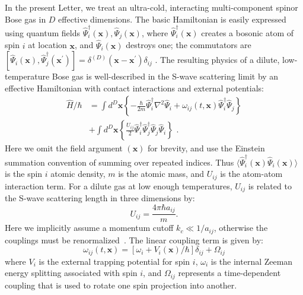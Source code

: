 \documentclass[aps,prl,twocolumn,showpacs,amsmath,amssymb,superscriptaddress]{revtex4-1}
\newcommand{\xvec}{\boldsymbol{x}}
\begin{document}
In the present Letter, we treat an ultra-cold,
interacting multi-component spinor Bose gas in $D$ effective dimensions.
The basic Hamiltonian is easily expressed using quantum fields
$\widehat{\Psi}_{i}^{\dagger}(\xvec),\widehat{\Psi}_{j}(\xvec)$,
where $\widehat{\Psi}_{i}^{\dagger}(\xvec)$ creates a bosonic atom of spin $i$
at location $\xvec$, and $\widehat{\Psi}_{i}(\xvec)$ destroys one;
the commutators are
$[\widehat{\Psi}_{i}(\xvec),\widehat{\Psi}_{j}^{\dagger}(\xvec^\prime)] =
\delta^{(D)}(\xvec-\xvec^\prime)\delta_{ij}\,\,.$
The resulting physics of a dilute, low-temperature Bose gas
is well-described in the S-wave scattering limit by an effective Hamiltonian
with contact interactions and external potentials:
\begin{equation}
\begin{split}
	\widehat{H} / \hbar & = \int d^{D}\xvec \left\{
		-\frac{\hbar}{2m} \widehat{\Psi}_{i}^{\dagger} \nabla^2 \widehat{\Psi}_{i} +
		\omega_{ij}(t,\xvec) \widehat{\Psi}_{i}^{\dagger} \widehat{\Psi}_{j}
	\right\} \\
	& + \int d^{D}\xvec \left\{
		\frac{U_{ij}}{2} \widehat{\Psi}_{i}^{\dagger} \widehat{\Psi}_{j}^{\dagger}
		\widehat{\Psi}_{j} \widehat{\Psi}_{i}
	\right\} \,\,.
\end{split}
\end{equation}
Here we omit the field argument $(\xvec)$ for brevity,
and use the Einstein summation convention of summing over repeated indices.
Thus $\langle \widehat{\Psi}_{i}^{\dagger}(\xvec) \widehat{\Psi}_{i}(\xvec) \rangle$
is the spin $i$ atomic density, $m$ is the atomic mass,
and $U_{ij}$ is the atom-atom interaction term.
For a dilute gas at low enough temperatures,
$U_{ij}$ is related to the S-wave scattering length in three dimensions by:
\begin{equation}
	U_{ij}=\frac{4\pi\hbar a_{ij}}{m}.
\end{equation}
Here we implicitly assume a momentum cutoff $k_{c} \ll 1 / a_{ij}$,
otherwise the couplings must be renormalized~\cite{Sinatra2002}.
The linear coupling term is given by:
\begin{equation}
	\omega_{ij}(t,\xvec) = \left[
		\omega_{i} + V_{i}(\xvec) / \hbar
	\right] \delta_{ij} + \Omega_{ij}
\end{equation}
where $V_{i}$ is the external trapping potential for spin $i$,
$\omega_{i}$ is the internal Zeeman energy splitting associated with spin $i$,
and $\Omega_{ij}$ represents a time-dependent coupling
that is used to rotate one spin projection into another.
\end{document}
